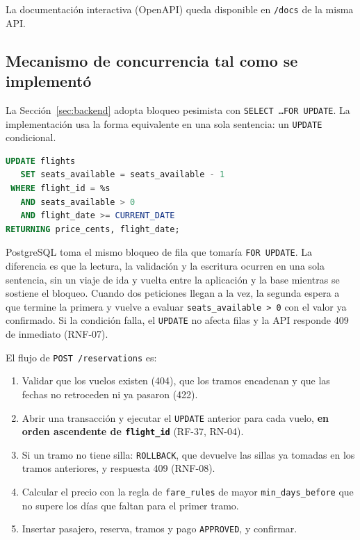 La documentación interactiva (OpenAPI) queda disponible en \texttt{/docs} de la misma API.

\subsection{Mecanismo de concurrencia tal como se implementó}
La Sección~\ref{sec:backend} adopta bloqueo pesimista con \texttt{SELECT \ldots FOR UPDATE}. La implementación usa la forma equivalente en una sola sentencia: un \texttt{UPDATE} condicional.

\begin{lstlisting}[language=SQL,caption={Descuento de una silla por tramo, dentro de la transacción de la reserva.}]
UPDATE flights
   SET seats_available = seats_available - 1
 WHERE flight_id = %s
   AND seats_available > 0
   AND flight_date >= CURRENT_DATE
RETURNING price_cents, flight_date;
\end{lstlisting}

PostgreSQL toma el mismo bloqueo de fila que tomaría \texttt{FOR UPDATE}. La diferencia es que la lectura, la validación y la escritura ocurren en una sola sentencia, sin un viaje de ida y vuelta entre la aplicación y la base mientras se sostiene el bloqueo. Cuando dos peticiones llegan a la vez, la segunda espera a que termine la primera y vuelve a evaluar \texttt{seats\_available > 0} con el valor ya confirmado. Si la condición falla, el \texttt{UPDATE} no afecta filas y la API responde 409 de inmediato (RNF-07).

El flujo de \texttt{POST /reservations} es:
\begin{enumerate}
  \item Validar que los vuelos existen (404), que los tramos encadenan y que las fechas no retroceden ni ya pasaron (422).
  \item Abrir una transacción y ejecutar el \texttt{UPDATE} anterior para cada vuelo, \textbf{en orden ascendente de \texttt{flight\_id}} (RF-37, RN-04).
  \item Si un tramo no tiene silla: \texttt{ROLLBACK}, que devuelve las sillas ya tomadas en los tramos anteriores, y respuesta 409 (RNF-08).
  \item Calcular el precio con la regla de \texttt{fare\_rules} de mayor \texttt{min\_days\_before} que no supere los días que faltan para el primer tramo.
  \item Insertar pasajero, reserva, tramos y pago \texttt{APPROVED}, y confirmar.
\end{enumerate}

